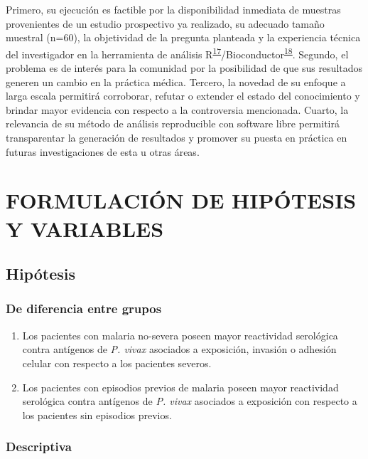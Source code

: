 \documentclass[a4paper]{article}
\begin{document}
Primero, su ejecución es factible por la disponibilidad inmediata de
muestras provenientes de un estudio prospectivo ya realizado, su
adecuado tamaño muestral (n=60), la objetividad de la pregunta planteada
y la experiencia técnica del investigador en la herramienta de análisis
R\textsuperscript{\protect\hyperlink{ref-R2016}{17}}/Bioconductor\textsuperscript{\protect\hyperlink{ref-bioconductor2004}{18}}.
Segundo, el problema es de interés para la comunidad por la posibilidad
de que sus resultados generen un cambio en la práctica médica. Tercero,
la novedad de su enfoque a larga escala permitirá corroborar, refutar o
extender el estado del conocimiento y brindar mayor evidencia con
respecto a la controversia mencionada. Cuarto, la relevancia de su
método de análisis reproducible con software libre permitirá
transparentar la generación de resultados y promover su puesta en
práctica en futuras investigaciones de esta u otras áreas.

\section{FORMULACIÓN DE HIPÓTESIS Y
VARIABLES}\label{formulacion-de-hipotesis-y-variables}

\subsection{Hipótesis}\label{hipotesis}

\subsubsection{De diferencia entre
grupos}\label{de-diferencia-entre-grupos}

\begin{enumerate}
\def\labelenumi{\arabic{enumi}.}
\item
  Los pacientes con malaria no-severa poseen mayor reactividad
  serológica contra antígenos de \emph{P. vivax} asociados a exposición,
  invasión o adhesión celular con respecto a los pacientes severos.
\item
  Los pacientes con episodios previos de malaria poseen mayor
  reactividad serológica contra antígenos de \emph{P. vivax} asociados a
  exposición con respecto a los pacientes sin episodios previos.
\end{enumerate}

\subsubsection{Descriptiva}\label{descriptiva}
\end{document}
